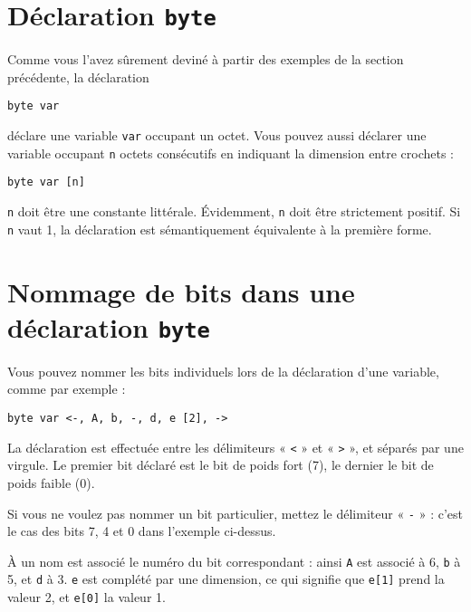 \section{Déclaration \texttt{byte}}

Comme vous l'avez sûrement deviné à partir des exemples de la section précédente, la déclaration

\begin{lstlisting}[language=piccolo]
byte var 
\end{lstlisting}

déclare une variable \texttt{var} occupant un octet. Vous pouvez aussi déclarer une variable occupant \texttt{n} octets consécutifs en indiquant la dimension entre crochets :

\begin{lstlisting}[language=piccolo]
byte var [n]
\end{lstlisting}

\texttt{n} doit être une constante littérale. Évidemment, \texttt{n} doit être strictement positif. Si \texttt{n} vaut 1, la déclaration est sémantiquement équivalente à la première forme.






\section{Nommage de bits dans une déclaration \texttt{byte}}

Vous pouvez nommer les bits individuels lors de la déclaration d'une variable, comme par exemple :

\begin{lstlisting}[language=piccolo]
byte var <-, A, b, -, d, e [2], ->
\end{lstlisting}

La déclaration est effectuée entre les délimiteurs « \texttt{<} » et « \texttt{>} », et séparés par une virgule. Le premier bit déclaré est le bit de poids fort (7), le dernier le bit de poids faible (0).

Si vous ne voulez pas nommer un bit particulier, mettez le délimiteur « \texttt{-} » : c'est le cas des bits 7, 4 et 0 dans l'exemple ci-dessus.

À un nom est associé le numéro du bit correspondant : ainsi \texttt{A} est associé à 6, \texttt{b} à 5, et \texttt{d} à 3. \texttt{e} est complété par une dimension, ce qui signifie que \texttt{e[1]} prend la valeur 2, et \texttt{e[0]} la valeur 1.

